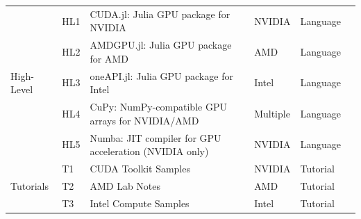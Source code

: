 \begin{table}[htbp]
\begin{tabular}{llp{8cm}lll}
		\hline
		\multirow{5}{*}{\small High-Level}
		                         & \small HL1         & \small CUDA.jl: Julia GPU package for NVIDIA                      & \small NVIDIA          & \small Language      & \small \cite{noauthor_juliagpucudajl_2025}            \\[1ex]
		                         & \small HL2         & \small AMDGPU.jl: Julia GPU package for AMD                       & \small AMD             & \small Language      & \small \cite{noauthor_juliagpuamdgpujl_2025}          \\[1ex]
		                         & \small HL3         & \small oneAPI.jl: Julia GPU package for Intel                     & \small Intel           & \small Language      & \small \cite{besard_oneapijl_2022}                    \\[1ex]
		                         & \small HL4         & \small CuPy: NumPy-compatible GPU arrays for NVIDIA/AMD           & \small Multiple        & \small Language      & \small \cite{okuta_cupy_2017, noauthor_cupycupy_2025} \\[1ex]
		                         & \small HL5         & \small Numba: JIT compiler for GPU acceleration (NVIDIA only)     & \small NVIDIA          & \small Language      & \small \cite{noauthor_numbanumba_2025}                \\
		\hline
		\multirow{5}{*}{\small Tutorials}
		                         & \small T1          & \small CUDA Toolkit Samples                                       & \small NVIDIA          & \small Tutorial      & \small \cite{noauthor_nvidiacuda-samples_2025}        \\[1ex]
		                         & \small T2          & \small AMD Lab Notes                                              & \small AMD             & \small Tutorial      & \small \cite{noauthor_amdamd-lab-notes_2025}          \\[1ex]
		                         & \small T3          & \small Intel Compute Samples                                      & \small Intel           & \small Tutorial      & \small \cite{noauthor_intelcompute-samples_2025}      \\
		\hline
	\end{tabular}
\end{table}


